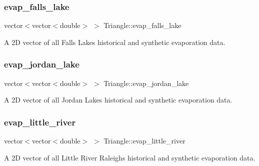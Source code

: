 \subsubsection{\texorpdfstring{evap\+\_\+falls\+\_\+lake}{evap\_falls\_lake}}
{\footnotesize\ttfamily vector$<$vector$<$double$>$ $>$ Triangle\+::evap\+\_\+falls\+\_\+lake\hspace{0.3cm}{\ttfamily [private]}}



A 2D vector of all Falls Lake\textquotesingle{}s historical and synthetic evaporation data. 

\mbox{\label{classTriangle_aa340181943eedb577bf81215e34701f5}} 
\subsubsection{\texorpdfstring{evap\+\_\+jordan\+\_\+lake}{evap\_jordan\_lake}}
{\footnotesize\ttfamily vector$<$vector$<$double$>$ $>$ Triangle\+::evap\+\_\+jordan\+\_\+lake\hspace{0.3cm}{\ttfamily [private]}}



A 2D vector of all Jordan Lake\textquotesingle{}s historical and synthetic evaporation data. 

\mbox{\label{classTriangle_a48c51eabed2ace852d31b1df2e98f8d4}} 
\subsubsection{\texorpdfstring{evap\+\_\+little\+\_\+river}{evap\_little\_river}}
{\footnotesize\ttfamily vector$<$vector$<$double$>$ $>$ Triangle\+::evap\+\_\+little\+\_\+river\hspace{0.3cm}{\ttfamily [private]}}



A 2D vector of all Little River Raleigh\textquotesingle{}s historical and synthetic evaporation data. 

\mbox{\label{classTriangle_a9b1fbfcfe6230372f486382bd3b47717}} 
